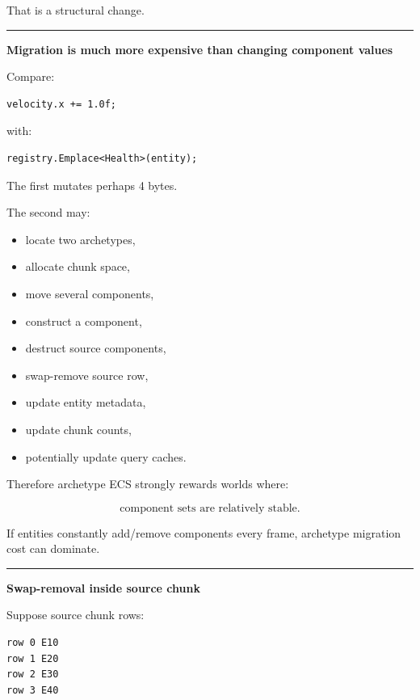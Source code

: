 That is a structural change.

\begin{center}\rule{0.5\linewidth}{0.5pt}\end{center}

\textbf{Migration is much more expensive than changing component values}

Compare:

\begin{verbatim}
velocity.x += 1.0f;
\end{verbatim}

with:

\begin{verbatim}
registry.Emplace<Health>(entity);
\end{verbatim}

The first mutates perhaps 4 bytes.

The second may:

\begin{itemize}
\tightlist
\item
  locate two archetypes,
\item
  allocate chunk space,
\item
  move several components,
\item
  construct a component,
\item
  destruct source components,
\item
  swap-remove source row,
\item
  update entity metadata,
\item
  update chunk counts,
\item
  potentially update query caches.
\end{itemize}

Therefore archetype ECS strongly rewards worlds where:

\[
\boxed{
\text{component sets are relatively stable}.
}
\]

If entities constantly add/remove components every frame, archetype migration cost can dominate.

\begin{center}\rule{0.5\linewidth}{0.5pt}\end{center}

\textbf{Swap-removal inside source chunk}

Suppose source chunk rows:

\begin{verbatim}
row 0 E10
row 1 E20
row 2 E30
row 3 E40
\end{verbatim}


